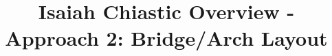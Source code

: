 \documentclass[11pt]{article}
\begin{document}
\title{Isaiah Chiastic Overview - Approach 2: Bridge/Arch Layout}
\date{}
\maketitle


\vspace{2cm}

\end{document}
